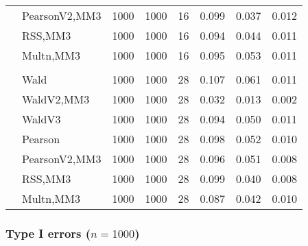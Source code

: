 \documentclass[
]{article}
\begin{document}
\begin{table}[H]
{\begin{tabular}[t]{llrrrrrr}
\hspace{1em} & PearsonV2,MM3 & 1000 & 1000 & 16 & 0.099 & 0.037 & 0.012\\

\hspace{1em} & RSS,MM3 & 1000 & 1000 & 16 & 0.094 & 0.044 & 0.011\\

\hspace{1em} & Multn,MM3 & 1000 & 1000 & 16 & 0.095 & 0.053 & 0.011\\
\cmidrule{1-8}
\addlinespace[0.3em]
\multicolumn{8}{l}{\textbf{3F 15V}}\\
\hspace{1em} & Wald & 1000 & 1000 & 28 & 0.107 & 0.061 & 0.011\\

\hspace{1em} & WaldV2,MM3 & 1000 & 1000 & 28 & 0.032 & 0.013 & 0.002\\

\hspace{1em} & WaldV3 & 1000 & 1000 & 28 & 0.094 & 0.050 & 0.011\\

\hspace{1em} & Pearson & 1000 & 1000 & 28 & 0.098 & 0.052 & 0.010\\

\hspace{1em} & PearsonV2,MM3 & 1000 & 1000 & 28 & 0.096 & 0.051 & 0.008\\

\hspace{1em} & RSS,MM3 & 1000 & 1000 & 28 & 0.099 & 0.040 & 0.008\\

\hspace{1em} & Multn,MM3 & 1000 & 1000 & 28 & 0.087 & 0.042 & 0.010\\
\bottomrule
\end{tabular}}
\end{table}

\hypertarget{type-i-errors-n1000}{%
\subsubsection{\texorpdfstring{Type I errors
(\(n=1000\))}{Type I errors (n=1000)}}\label{type-i-errors-n1000}}
\end{document}
